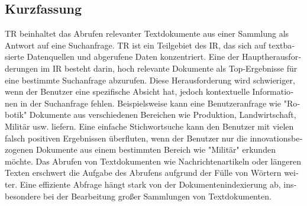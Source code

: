 
\begin{otherlanguage}{ngerman}
    \section*{Kurzfassung}
\ac{TR} beinhaltet das Abrufen relevanter Textdokumente aus einer Sammlung als Antwort auf eine Suchanfrage. \ac{TR} ist ein Teilgebiet des \ac{IR}, das sich auf textbasierte Datenquellen und abgerufene Daten konzentriert. Eine der Hauptherausforderungen im \ac{IR} besteht darin, hoch relevante Dokumente als Top-Ergebnisse für eine bestimmte Suchanfrage abzurufen. Diese Herausforderung wird schwieriger, wenn der Benutzer eine spezifische Absicht hat, jedoch kontextuelle Informationen in der Suchanfrage fehlen. Beispielsweise kann eine Benutzeranfrage wie "Robotik" Dokumente aus verschiedenen Bereichen wie Produktion, Landwirtschaft, Militär usw. liefern. Eine einfache Stichwortsuche kann den Benutzer mit vielen falsch positiven Ergebnissen überfluten, wenn der Benutzer nur die innovationsbezogenen Dokumente aus einem bestimmten Bereich wie "Militär" erkunden möchte. Das Abrufen von Textdokumenten wie Nachrichtenartikeln oder längeren Texten erschwert die Aufgabe des Abrufens aufgrund der Fülle von Wörtern weiter. Eine effiziente Abfrage hängt stark von der Dokumentenindexierung ab, insbesondere bei der Bearbeitung großer Sammlungen von Textdokumenten.


\end{otherlanguage}
